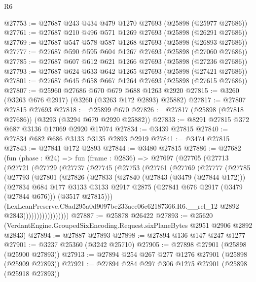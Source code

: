 \begin{lexlean}{R6}
\begin{coremodule}
@27753 := @27687 @243 @434 @479 @1270 @27693 (@25898 (@25977 @27686))
@27761 := @27687 @210 @496 @571 @1269 @27693 (@25898 (@26291 @27686))
@27769 := @27687 @547 @578 @587 @1268 @27693 (@25898 (@26893 @27686))
@27777 := @27687 @590 @595 @604 @1267 @27693 (@25898 (@27060 @27686))
@27785 := @27687 @607 @612 @621 @1266 @27693 (@25898 (@27236 @27686))
@27793 := @27687 @624 @633 @642 @1265 @27693 (@25898 (@27421 @27686))
@27801 := @27687 @645 @658 @667 @1264 @27693 (@25898 (@27615 @27686))
@27807 := @25960 @27686 @670 @679 @688 @1263 @2920
@27815 := @3260 (@3263 @676 @2917) (@3260 (@3263 @172 @2893) @25882)
@27817 := @27807 @27815 @27693
@27818 := @25899 @670
@27826 := @27817 (@25898 (@27818 @27686)) (@3293 (@3294 @679 @2920 @25882))
@27833 := @8291 @27815 @372 @687 @3136 @17069 @2920 @17074
@27834 := @3439 @27815
@27840 := @27834 @682 @686 @3133 @3135 @2893 @2919
@27841 := @3474 @27815
@27843 := @27841 @172 @2893
@27844 := @3480 @27815
@27886 := @27682
    (fun (phase : @24) =>
    fun (frame : @2836) =>
    @27697
      (@27705
        (@27713
          (@27721
            (@27729
              (@27737
                (@27745
                  (@27753
                    (@27761
                      (@27769
                        (@27777
                          (@27785
                            (@27793
                              (@27801
                                (@27826
                                  (@27833
                                    (@27840
                                      (@27843 (@3479 (@27844 @172)))
                                      (@27834
                                        @684
                                        @177
                                        @3133
                                        @3133
                                        @2917
                                        @2875
                                        (@27841 @676 @2917 (@3479 (@27844 @676)))
                                        (@3517 @27815)))
                                    (LexLeanPreserve.C8ad295a0d9097be233aee06c62187366.R6.__rel_12
                                      @2892
                                      @2843)))))))))))))))))
@27887 := @25878 @26422
@27893 := @25620 (VerdantEngine.GroupedSixEncoding.Request.sixPlaneBytes @2951 @2906 @2892 @2843)
@27894 := @27887 @27893
@27898 := @27894 @136 @147 @247 @1277
@27901 := @3237 @25360 (@3242 @25710)
@27905 := @27898 @27901 (@25898 (@25900 @27893))
@27913 := @27894 @254 @267 @277 @1276 @27901 (@25898 (@25909 @27893))
@27921 := @27894 @284 @297 @306 @1275 @27901 (@25898 (@25918 @27893))

\end{coremodule}
\end{lexlean}

